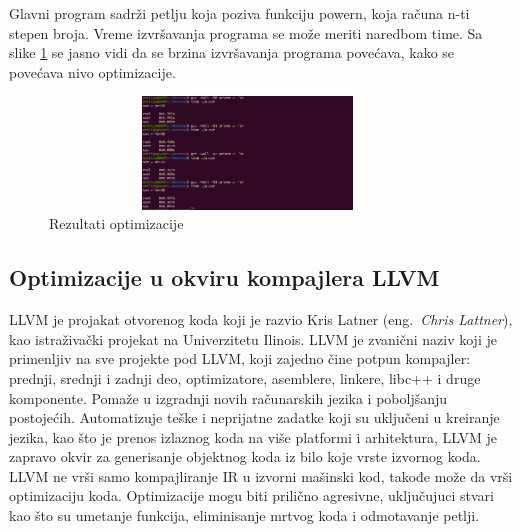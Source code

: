 \documentclass[a4paper]{article}
\begin{document}
Glavni program sadrži petlju koja poziva funkciju powern, koja računa n-ti stepen broja. Vreme izvršavanja programa se može meriti naredbom time. Sa slike \ref{fig:Rezultati_optimizacije} se jasno vidi da se brzina izvršavanja programa povećava, kako se povećava nivo optimizacije.

\begin{figure}[h!]
    \begin{center}
        \includegraphics[width=105mm, height=30mm]{pics/test.png}
    \end{center}
    \caption {Rezultati optimizacije}
    \label{fig:Rezultati_optimizacije}

\end{figure}


\subsection{Optimizacije u okviru kompajlera LLVM}
\label{subsec:optimizacijeLLVM}

LLVM je projakat otvorenog koda koji je razvio Kris Latner (eng.~{\em Chris Lattner}), kao istraživački projekat na Univerzitetu Ilinois. LLVM je zvanični naziv koji je primenljiv na sve projekte pod LLVM, koji zajedno čine potpun kompajler: prednji, srednji i zadnji deo, optimizatore, asemblere, linkere, libc++ i druge komponente. Pomaže u izgradnji novih računarskih jezika i poboljšanju postojećih. Automatizuje teške i neprijatne zadatke koji su uključeni u kreiranje jezika, kao što je prenos izlaznog koda na više platformi i arhitektura, LLVM je zapravo okvir za generisanje objektnog koda iz bilo koje vrste izvornog koda. LLVM ne vrši samo kompajliranje IR u izvorni mašinski kod, takođe može da vrši optimizaciju koda. Optimizacije mogu biti prilično agresivne, uključujuci stvari kao što su umetanje funkcija, eliminisanje mrtvog koda i odmotavanje petlji. \cite{llvm1} \cite{gccVsClang}
\end{document}

